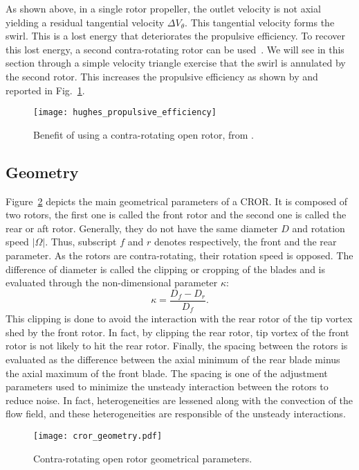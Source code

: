 
As shown above, in a single rotor propeller, the outlet velocity is not axial
yielding a residual tangential velocity $\Delta V_{\theta}$. 
This tangential velocity forms the swirl. 
This is a lost energy that deteriorates the propulsive efficiency. 
To recover this lost energy, a second contra-rotating rotor can be used~\cite{Hager1988}.
We will see in this section through a simple velocity triangle exercise that
the swirl is annulated by the second rotor. This increases the propulsive
efficiency as shown by \citet{Hughes1989} and reported 
in Fig.~\ref{fig:hughes_propulsive_efficiency}.
\begin{figure}
  \centering
  \texttt{[image: hughes\_propulsive\_efficiency]}
  \caption{Benefit of using a contra-rotating open rotor, from \citet{Hughes1989}.}
  \label{fig:hughes_propulsive_efficiency}
\end{figure}

\subsection{Geometry}
\label{sub:cror_geometry}

Figure~\ref{fig:cror_geometry} depicts the main
geometrical parameters of a CROR.
It is composed of two rotors, the first one is called
the front rotor and the second one is called the rear or aft rotor.
Generally, they do not have the same diameter $D$ and rotation speed
$| \Omega |$. Thus, subscript $f$ and $r$ denotes respectively,
the front and the rear parameter.
As the rotors are contra-rotating, their rotation speed is opposed.
The difference of diameter is called the clipping or cropping
of the blades and is evaluated through the non-dimensional parameter
$\kappa$:
\begin{equation}
    \kappa = \frac{D_f - D_r}{D_f}.
\end{equation}
This clipping is done to avoid the interaction 
with the rear rotor of the tip vortex shed
by the front rotor. In fact, by clipping the rear
rotor, tip vortex of the front rotor is not likely
to hit the rear rotor.
Finally, the spacing between the rotors
is evaluated as the difference between the axial minimum of the
rear blade minus the axial maximum of the front blade. The spacing
is one of the adjustment parameters used to minimize the unsteady
interaction between the rotors to reduce noise. In fact, 
heterogeneities are lessened along with the convection of
the flow field, and these heterogeneities are responsible
of the unsteady interactions.
\begin{figure}
  \centering
  \texttt{[image: cror\_geometry.pdf]}
  \caption{Contra-rotating open rotor geometrical parameters.}
  \label{fig:cror_geometry}
\end{figure}

